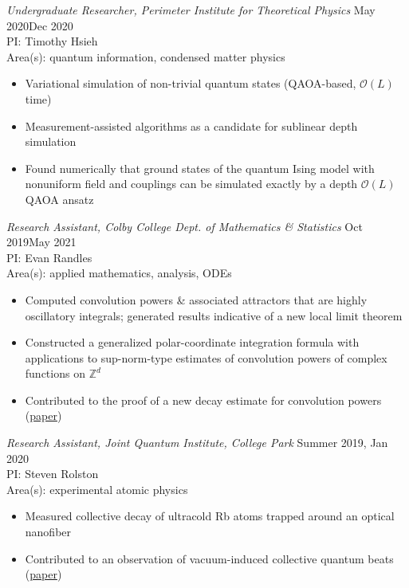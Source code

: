 \documentclass[10pt]{article}
\begin{document}
\noindent \textit{Undergraduate Researcher, Perimeter Institute for Theoretical Physics} \hfill May 2020\textendash Dec 2020\\
PI: Timothy Hsieh \\
Area(s): quantum information, condensed matter physics \vspace{-5pt}
\begin{itemize}
	\setlength\itemsep{-4pt}
	\item Variational simulation of non-trivial quantum states (QAOA-based, $\mathcal{O}(L)$ time)  
	\item Measurement-assisted algorithms as a candidate for sublinear depth simulation  
	\item Found numerically that ground states of the quantum Ising model with nonuniform field and couplings can be simulated exactly by a depth $\mathcal{O}(L)$ QAOA ansatz
\end{itemize}


\noindent \textit{Research Assistant, Colby College Dept. of Mathematics \& Statistics} \hfill Oct 2019\textendash May 2021\\
PI: Evan Randles  \\ 
Area(s): applied mathematics, analysis, ODEs  \vspace{-5pt}
\begin{itemize}
	\setlength\itemsep{-4pt}
	\item Computed convolution powers \& associated attractors that are highly oscillatory integrals; generated results indicative of a new local limit theorem
	\item Constructed a generalized polar-coordinate integration formula with applications to sup-norm-type estimates of convolution powers of complex functions on $\mathbb{Z}^d$
	\item Contributed to the proof of a new decay estimate for convolution powers (\href{https://arxiv.org/abs/2103.04161}{paper}) 
\end{itemize}


\noindent \textit{Research Assistant, Joint Quantum Institute, College Park} \hfill Summer 2019, Jan 2020  \\
PI:  Steven Rolston\\  %
Area(s): experimental atomic physics  \vspace{-5pt}
\begin{itemize}
	\setlength\itemsep{-4pt}
	\item Measured collective decay of ultracold Rb atoms trapped around an optical nanofiber
	\item Contributed to an observation of vacuum-induced collective quantum beats (\href{https://arxiv.org/abs/2102.11982}{paper})
\end{itemize}
\end{document}
